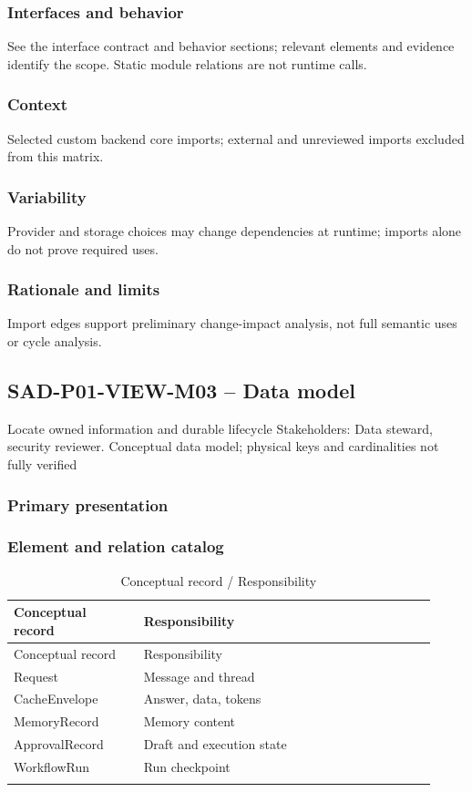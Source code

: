 \documentclass[10pt,letterpaper]{article}
\begin{document}
\subsubsection{Interfaces and behavior}
See the interface contract and behavior sections; relevant elements and evidence identify the scope. Static module relations are not runtime calls.
\subsubsection{Context}
Selected custom backend core imports; external and unreviewed imports excluded from this matrix.
\subsubsection{Variability}
Provider and storage choices may change dependencies at runtime; imports alone do not prove required uses.
\subsubsection{Rationale and limits}
Import edges support preliminary change-impact analysis, not full semantic uses or cycle analysis.
\subsection{SAD-P01-VIEW-M03 -- Data model}
Locate owned information and durable lifecycle Stakeholders: Data steward, security reviewer. Conceptual data model; physical keys and cardinalities not fully verified
\subsubsection{Primary presentation}

\subsubsection{Element and relation catalog}
\begin{longtable}{@{}>{\raggedright\arraybackslash}p{0.29\linewidth}>{\raggedright\arraybackslash}p{0.63\linewidth}@{}}
\caption{Conceptual record / Responsibility}\\
\toprule Conceptual record & Responsibility\\\midrule\endfirsthead
\toprule Conceptual record & Responsibility\\\midrule\endhead
Request & Message and thread\\\addlinespace
CacheEnvelope & Answer, data, tokens\\\addlinespace
MemoryRecord & Memory content\\\addlinespace
ApprovalRecord & Draft and execution state\\\addlinespace
WorkflowRun & Run checkpoint\\\addlinespace
\bottomrule\end{longtable}
\end{document}
